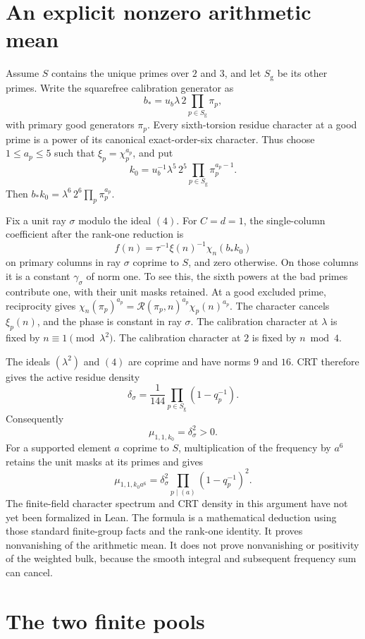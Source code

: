 \documentclass{article}
\begin{document}
\section*{An explicit nonzero arithmetic mean}

Assume $S$ contains the unique primes over $2$ and $3$, and let
$S_{\mathrm g}$ be its other primes.
Write the squarefree calibration generator as
\[
 b_*=u_b\lambda\,2\prod_{p\in S_{\mathrm g}}\pi_p,
\]
with primary good generators $\pi_p$.
Every sixth-torsion residue character at a good prime is a power of its
canonical exact-order-six character.
Thus choose $1\le a_p\le5$ such that $\xi_p=\chi_p^{a_p}$, and put
\[
 k_0=u_b^{-1}\lambda^5\,2^5
       \prod_{p\in S_{\mathrm g}}\pi_p^{a_p-1}.
\]
Then $b_*k_0=\lambda^6\,2^6\prod_p\pi_p^{a_p}$.

Fix a unit ray $\sigma$ modulo the ideal $(4)$.
For $C=d=1$, the single-column coefficient after the rank-one reduction is
\[
 f(n)=\tau^{-1}\xi(n)^{-1}\chi_n(b_*k_0)
\]
on primary columns in ray $\sigma$ coprime to $S$, and zero otherwise.
On those columns it is a constant $\gamma_\sigma$ of norm one.
To see this, the sixth powers at the bad primes contribute one, with their
unit masks retained.
At a good excluded prime, reciprocity gives
$\chi_n(\pi_p)^{a_p}
=\mathcal R(\pi_p,n)^{a_p}\chi_p(n)^{a_p}$.
The character cancels $\xi_p(n)$, and the phase is constant in ray $\sigma$.
The calibration character at $\lambda$ is fixed by
$n\equiv1\pmod{\lambda^2}$.
The calibration character at $2$ is fixed by $n\bmod4$.

The ideals $(\lambda^2)$ and $(4)$ are coprime and have norms $9$ and $16$.
CRT therefore gives the active residue density
\[
 \delta_\sigma=\frac1{144}
     \prod_{p\in S_{\mathrm g}}(1-q_p^{-1}).
\]
Consequently
\[
 \mu_{1,1,k_0}=\delta_\sigma^2>0.
\]
For a supported element $a$ coprime to $S$, multiplication of the frequency
by $a^6$ retains the unit masks at its primes and gives
\[
 \mu_{1,1,k_0a^6}
 =\delta_\sigma^2\prod_{p\mid(a)}(1-q_p^{-1})^2.
\]
The finite-field character spectrum and CRT density in this argument have
not yet been formalized in Lean.
The formula is a mathematical deduction using those standard finite-group
facts and the rank-one identity.
It proves nonvanishing of the arithmetic mean.
It does not prove nonvanishing or positivity of the weighted bulk, because
the smooth integral and subsequent frequency sum can cancel.

\section*{The two finite pools}
\end{document}

